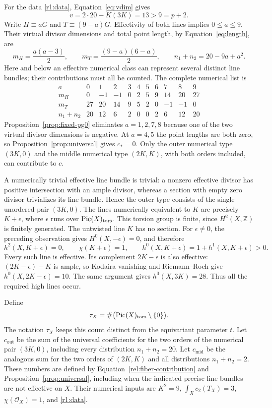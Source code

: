 For the data \eqref{r1:data}, Equation~\eqref{eq:vdim} gives
\[
 v=2\cdot20-K(3K)=13>9=p+2.
\]
Write $H\equiv aG$ and $T\equiv(9-a)G$.  Effectivity of both lines
implies $0\leq a\leq9$.  Their virtual divisor dimensions and total
point length, by Equation~\eqref{eq:length}, are
\begin{equation}\label{r1:numerical-classes}
 m_H=\frac{a(a-3)}2,\qquad
 m_T=\frac{(9-a)(6-a)}2,\qquad
 n_1+n_2=20-9a+a^2.
\end{equation}
Here and below an effective numerical class can represent several
distinct line bundles; their contributions must all be counted.
The complete numerical list is
\[
\begin{array}{c|rrrrrrrrrr}
 a&0&1&2&3&4&5&6&7&8&9\\ \hline
 m_H&0&-1&-1&0&2&5&9&14&20&27\\
 m_T&27&20&14&9&5&2&0&-1&-1&0\\
 n_1+n_2&20&12&6&2&0&0&2&6&12&20
\end{array}
\]
Proposition~\ref{prop:fixed-pg0} eliminates $a=1,2,7,8$ because one
of the two virtual divisor dimensions is negative.  At $a=4,5$ the
point lengths are both zero, so Proposition~\ref{prop:universal} gives
$c_*=0$.  Only the outer numerical type $(3K,0)$ and the middle
numerical type $(2K,K)$, with both orders included, can contribute to
$c$.

A numerically trivial effective line bundle is trivial: a nonzero
effective divisor has positive intersection with an ample divisor,
whereas a section with empty zero divisor trivializes its line bundle.
Hence the outer type consists of the single unordered pair $(3K,0)$.
The lines numerically equivalent to $K$ are precisely $K+\epsilon$,
where $\epsilon$ runs over $\operatorname{Pic}(X)_{\mathrm{tors}}$.  This torsion
group is finite, since $H^2(X,\mathbb Z)$ is finitely generated.  The
untwisted line $K$ has no section.  For $\epsilon\neq0$, the preceding
observation gives $H^0(X,-\epsilon)=0$, and therefore
\[
 h^2(X,K+\epsilon)=0,\qquad
 \chi(K+\epsilon)=1,\qquad
 h^0(X,K+\epsilon)=1+h^1(X,K+\epsilon)>0.
\]
Every such line is effective.  Its complement $2K-\epsilon$ is also
effective: $(2K-\epsilon)-K$ is ample, so Kodaira vanishing and
Riemann--Roch give $h^0(X,2K-\epsilon)=10$.  The same argument gives
$h^0(X,3K)=28$.  Thus all the required high lines occur.

Define
\begin{equation}\label{r1:torsion-count}
 \tau_X=\#\bigl(\operatorname{Pic}(X)_{\mathrm{tors}}\setminus\{0\}\bigr).
\end{equation}
The notation $\tau_X$ keeps this count distinct from the equivariant
parameter $t$.  Let $c_{\mathrm{out}}$ be the sum of the universal
coefficients for the two orders of the numerical pair $(3K,0)$,
including every distribution $n_1+n_2=20$.  Let
$c_{\mathrm{mid}}$ be the analogous sum for the two orders of
$(2K,K)$ and all distributions $n_1+n_2=2$.  These numbers are
defined by Equation~\eqref{rel:fiber-contribution} and
Proposition~\ref{prop:universal}, including when the indicated precise
line bundles are not effective on $X$.  Their numerical inputs are
$K^2=9$, $\int_Xc_2(T_X)=3$, $\chi(\mathcal O_X)=1$, and
\eqref{r1:data}.

